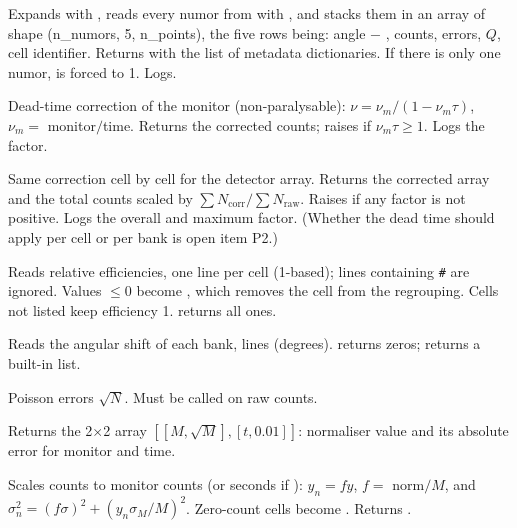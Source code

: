 \documentclass[11pt,a4paper]{article}
\begin{document}
Expands  with , reads every
numor from  with , and stacks
them in an array of shape (n\_numors, 5, n\_points), the five rows being:
angle $-$ , counts, errors, $Q$, cell identifier. Returns
 with  the list of metadata dictionaries.
If there is only one numor,  is forced to 1. Logs.


Dead-time correction of the monitor (non-paralysable):
$\nu = \nu_m/(1-\nu_m\tau)$, $\nu_m = $ monitor$/$time. Returns the
corrected counts; raises  if $\nu_m\tau\ge1$. Logs the factor.

 
Same correction cell by cell for the detector array. Returns the corrected
array and the total counts scaled by $\sum N_\mathrm{corr}/\sum N_\mathrm{raw}$.
Raises  if any factor is not positive. Logs the overall
and maximum factor. (Whether the dead time should apply per cell or per
bank is open item P2.)

 
Reads relative efficiencies, one line  per cell
(1-based); lines containing \texttt{\#} are ignored. Values $\le0$ become
, which removes the cell from the regrouping. Cells not listed
keep efficiency 1.  returns all ones.

 
Reads the angular shift of each bank, lines  (degrees).
 returns zeros;  returns a built-in list.

Poisson errors $\sqrt{N}$. Must be called on raw counts.

Returns the 2$\times$2 array $[[M, \sqrt M],[t, 0.01]]$: normaliser value
and its absolute error for monitor and time.

 
Scales counts to  monitor counts (or 
seconds if ): $y_n = f y$, $f=$ norm$/M$, and
$\sigma_n^2 = (f\sigma)^2 + (y_n\sigma_M/M)^2$. Zero-count cells become
. Returns .
\end{document}
